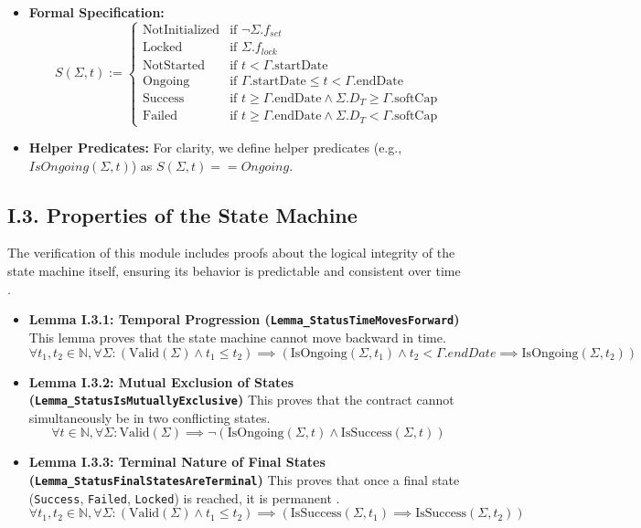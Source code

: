 \documentclass[
  english,
  onecolumn]{article}
\providecommand{\tightlist}{%
  \setlength{\itemsep}{0pt}\setlength{\parskip}{0pt}}
\begin{document}
\begin{itemize}
\tightlist
\item
  \textbf{Formal Specification:} \[
  S(\Sigma, t) := \begin{cases}
  \text{NotInitialized} & \text{if } \neg \Sigma.f_{set} \\
  \text{Locked} & \text{if } \Sigma.f_{lock} \\
  \text{NotStarted} & \text{if } t < \Gamma.\text{startDate} \\
  \text{Ongoing} & \text{if } \Gamma.\text{startDate} \le t < \Gamma.\text{endDate} \\
  \text{Success} & \text{if } t \ge \Gamma.\text{endDate} \land \Sigma.D_T \ge \Gamma.\text{softCap} \\
  \text{Failed} & \text{if } t \ge \Gamma.\text{endDate} \land \Sigma.D_T < \Gamma.\text{softCap}
  \end{cases}
  \]
\item
  \textbf{Helper Predicates:} For clarity, we define helper predicates
  (e.g., \(IsOngoing(\Sigma, t)\)) as \(S(\Sigma, t) == Ongoing\).
\end{itemize}

\subsection{I.3. Properties of the State
Machine}\label{i.3.-properties-of-the-state-machine}

The verification of this module includes proofs about the logical
integrity of the state machine itself, ensuring its behavior is
predictable and consistent over time \citep{baier2008principles}.

\begin{itemize}
\item
  \textbf{Lemma I.3.1: Temporal Progression
  (\texttt{Lemma\_StatusTimeMovesForward})} This lemma proves that the
  state machine cannot move backward in time.
  \[ \forall t_1, t_2 \in \mathbb{N}, \forall \Sigma : (\text{Valid}(\Sigma) \land t_1 \le t_2) \implies (\text{IsOngoing}(\Sigma, t_1) \land t_2 < \Gamma.endDate \implies \text{IsOngoing}(\Sigma, t_2)) \]
\item
  \textbf{Lemma I.3.2: Mutual Exclusion of States
  (\texttt{Lemma\_StatusIsMutuallyExclusive})} This proves that the
  contract cannot simultaneously be in two conflicting states.
  \[ \forall t \in \mathbb{N}, \forall \Sigma : \text{Valid}(\Sigma) \implies \neg(\text{IsOngoing}(\Sigma, t) \land \text{IsSuccess}(\Sigma, t)) \]
\item
  \textbf{Lemma I.3.3: Terminal Nature of Final States
  (\texttt{Lemma\_StatusFinalStatesAreTerminal})} This proves that once
  a final state (\texttt{Success}, \texttt{Failed}, \texttt{Locked}) is
  reached, it is permanent \citep{alpern1985defining}.
  \[ \forall t_1, t_2 \in \mathbb{N}, \forall \Sigma : (\text{Valid}(\Sigma) \land t_1 \le t_2) \implies (\text{IsSuccess}(\Sigma, t_1) \implies \text{IsSuccess}(\Sigma, t_2)) \]
\end{itemize}
\end{document}
